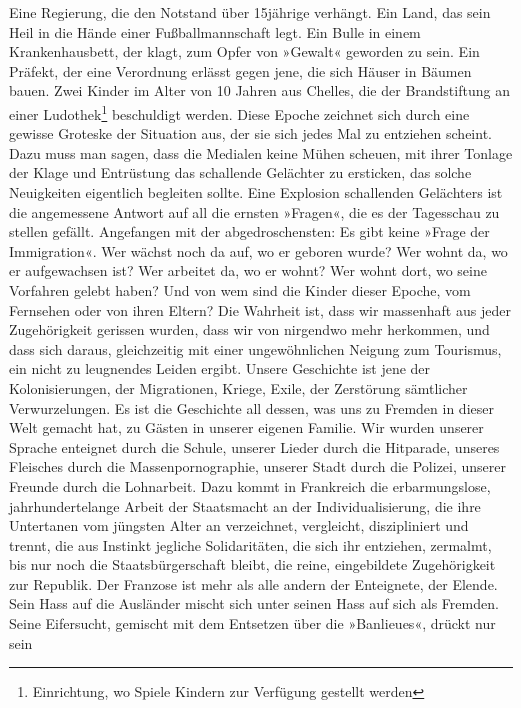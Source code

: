 
Eine Regierung, die den Notstand über 15jährige verhängt. Ein Land,
das sein Heil in die Hände einer Fußballmannschaft legt. Ein Bulle
in einem Krankenhausbett, der klagt, zum Opfer von »Gewalt«
geworden zu sein. Ein Präfekt, der eine Verordnung erlässt gegen
jene, die sich Häuser in Bäumen bauen. Zwei Kinder im Alter von 10
Jahren aus Chelles, die der Brandstiftung an einer Ludothek\footnote{
Einrichtung, wo Spiele Kindern zur Verfügung gestellt werden
}
beschuldigt werden. Diese Epoche zeichnet sich durch eine gewisse
Groteske der Situation aus, der sie sich jedes Mal zu entziehen
scheint. Dazu muss man sagen, dass die Medialen keine Mühen
scheuen, mit ihrer Tonlage der Klage und Entrüstung das schallende
Gelächter zu ersticken, das solche Neuigkeiten eigentlich begleiten
sollte.
Eine Explosion schallenden Gelächters ist die angemessene Antwort
auf all die ernsten »Fragen«, die es der Tagesschau zu stellen
gefällt. Angefangen mit der abgedroschensten: Es gibt keine »Frage
der Immigration«. Wer wächst noch da auf, wo er geboren wurde? Wer
wohnt da, wo er aufgewachsen ist? Wer arbeitet da, wo er wohnt? Wer
wohnt dort, wo seine Vorfahren gelebt haben? Und von wem sind die
Kinder dieser Epoche, vom Fernsehen oder von ihren Eltern? Die
Wahrheit ist, dass wir massenhaft aus jeder Zugehörigkeit gerissen
wurden, dass wir von nirgendwo mehr herkommen, und dass sich
daraus, gleichzeitig mit einer ungewöhnlichen Neigung zum
Tourismus, ein nicht zu leugnendes Leiden ergibt. Unsere Geschichte
ist jene der Kolonisierungen, der Migrationen, Kriege, Exile, der
Zerstörung sämtlicher Verwurzelungen. Es ist die Geschichte all
dessen, was uns zu Fremden in dieser Welt gemacht hat, zu Gästen in
unserer eigenen Familie. Wir wurden unserer Sprache enteignet durch
die Schule, unserer Lieder durch die Hitparade, unseres Fleisches
durch die Massenpornographie, unserer Stadt durch die Polizei,
unserer Freunde durch die Lohnarbeit. Dazu kommt in Frankreich die
erbarmungslose, jahrhundertelange Arbeit der Staatsmacht an der
Individualisierung, die ihre Untertanen vom jüngsten Alter an
verzeichnet, vergleicht, diszipliniert und trennt, die aus Instinkt
jegliche Solidaritäten, die sich ihr entziehen, zermalmt, bis nur
noch die Staatsbürgerschaft bleibt, die reine, eingebildete
Zugehörigkeit zur Republik. Der Franzose ist mehr als alle andern
der Enteignete, der Elende. Sein Hass auf die Ausländer mischt sich
unter seinen Hass auf sich als Fremden. Seine Eifersucht, gemischt
mit dem Entsetzen über die »Banlieues«, drückt nur sein
